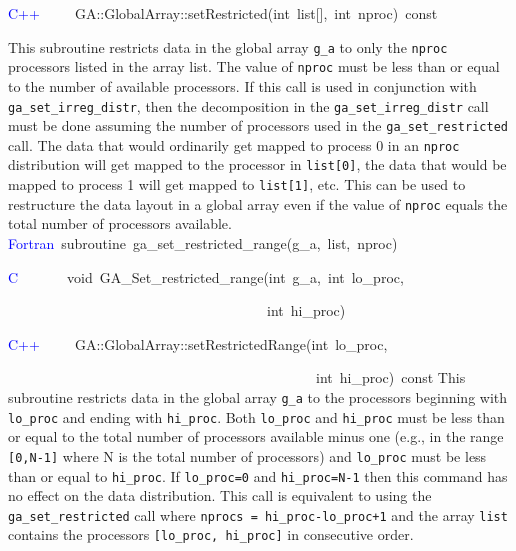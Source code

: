 \textcolor{blue}{C++}~~~~~GA::GlobalArray::setRestricted(int~list{[}{]},~int~nproc)~const

This subroutine restricts data in the global array \texttt{g\_a} to
only the \texttt{nproc} processors listed in the array list. The value
of \texttt{nproc} must be less than or equal to the number of available
processors. If this call is used in conjunction with \texttt{ga\_set\_irreg\_distr},
then the decomposition in the \texttt{ga\_set\_irreg\_distr} call
must be done assuming the number of processors used in the \texttt{ga\_set\_restricted}
call. The data that would ordinarily get mapped to process 0 in an
\texttt{nproc} distribution will get mapped to the processor in \texttt{list{[}0{]}},
the data that would be mapped to process 1 will get mapped to \texttt{list{[}1{]}},
etc. This can be used to restructure the data layout in a global array
even if the value of \texttt{nproc} equals the total number of processors
available. 
\textcolor{blue}{Fortran}~subroutine~ga\_set\_restricted\_range(g\_a,~list,~nproc)~

\textcolor{blue}{C}~~~~~~~void~GA\_Set\_restricted\_range(int~g\_a,~int~lo\_proc,~

~~~~~~~~~~~~~~~~~~~~~~~~~~~~~~~~~~~~~int~hi\_proc)~

\textcolor{blue}{C++~}~~~~GA::GlobalArray::setRestrictedRange(int~lo\_proc,~

~~~~~~~~~~~~~~~~~~~~~~~~~~~~~~~~~~~~~~~~~~~~int~hi\_proc)~const
This subroutine restricts data in the global array \texttt{g\_a} to
the processors beginning with\texttt{ lo\_proc} and ending with \texttt{hi\_proc}.
Both \texttt{lo\_proc} and \texttt{hi\_proc} must be less than or
equal to the total number of processors available minus one (e.g.,
in the range \texttt{{[}0,N-1{]}} where N is the total number of processors)
and \texttt{lo\_proc} must be less than or equal to \texttt{hi\_proc}.
If \texttt{lo\_proc=0} and \texttt{hi\_proc=N-1} then this command
has no effect on the data distribution. This call is equivalent to
using the \texttt{ga\_set\_restricted} call where \texttt{nprocs =
hi\_proc-lo\_proc+1} and the array \texttt{list} contains the processors
\texttt{{[}lo\_proc, hi\_proc{]}} in consecutive order. 
